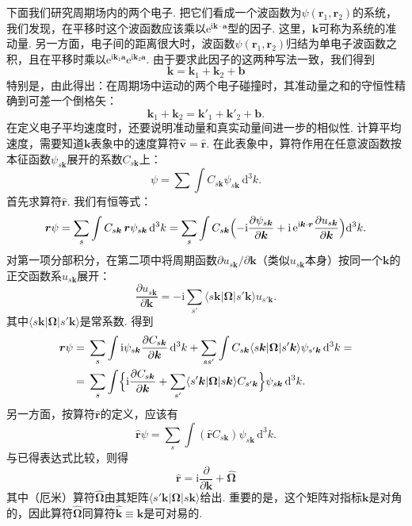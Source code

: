 下面我们研究周期场内的两个电子. 把它们看成一个波函数为$\psi(\bm r_1,\bm r_2)$的系统，我们发现，在平移时这个波函数应该乘以$\mathrm e^{\mathrm i\bm k\cdot\bm a}$型的因子. 这里，$\bm k$可称为系统的准动量. 另一方面，电子间的距离很大时，波函数$\psi(\bm r_1,\bm r_2)$归结为单电子波函数之积，且在平移时乘以$\mathrm e^{\mathrm i\bm k_1\bm a}\mathrm e^{\mathrm i\bm k_2\bm a}$. 由于要求此因子的这两种写法一致，我们得到
\begin{equation}
\bm k=\bm k_1+\bm k_2+\bm b
\label{55.10}
\end{equation}
特别是，由此得出：在周期场中运动的两个电子碰撞时，其准动量之和的守恒性精确到可差一个倒格矢：
\begin{equation}
\bm k_1+\bm k_2=\bm k'_1+\bm k'_2+\bm b.
\label{55.11}
\end{equation}
在定义电子平均速度时，还要说明准动量和真实动量间进一步的相似性. 计算平均速度，需要知道$\bm k$表象中的速度算符$\hat{\bm v}=\hat{\bm r}$. 在此表象中，算符作用在任意波函数按本征函数$\psi_{s\bm k}$展开的系数$C_{s\bm k}$上：
\begin{equation}
\psi=\sum\int C_{s\bm k}\psi_{s\bm k}\,\mathrm d^3k.
\label{55.12}
\end{equation}
首先求算符$\hat{\bm r}$. 我们有恒等式：
\begin{equation*}
\bm r\psi=\sum_s\int C_{s\bm k}\,\bm r\psi_{s\bm k}\,\mathrm d^3k
=\sum_s\int C_{s\bm k}\Bigl(-\mathrm i\frac{\partial\psi_{s\bm k}}{\partial\bm k}
+\mathrm i\,\mathrm e^{\mathrm i\bm k\cdot\bm r}\frac{\partial u_{s\bm k}}{\partial\bm k}\Bigr)\mathrm d^3k.
\end{equation*}
对第一项分部积分，在第二项中将周期函数$\partial u_{s\bm k}/\partial\bm k$（类似$u_{s\bm k}$本身）按同一个$\bm k$的正交函数系$u_{s\bm k}$展开：
\begin{equation}
\frac{\partial u_{s\bm k}}{\partial\bm k}
=-\mathrm i\sum_{s'}\langle s\bm k|\bm\Omega|s'\bm k\rangle u_{s'\bm k}.
\label{55.13}
\end{equation}
其中$\langle s\bm k|\bm\Omega|s'\bm k\rangle$是常系数. 得到
\begin{equation*}
\begin{aligned}
\bm r\psi={}&\sum_s\int\mathrm i\psi_{s\bm k}\frac{\partial C_{s\bm k}}{\partial\bm k}\,\mathrm d^3k
+\sum_{ss'}\int C_{s\bm k}\langle s\bm k|\bm\Omega|s'\bm k\rangle\psi_{s'\bm k}\,\mathrm d^3k=\\
={}&\sum_s\int\Bigl\{\mathrm i\frac{\partial C_{s\bm k}}{\partial\bm k}
+\sum_{s'}\langle s'\bm k|\bm\Omega|s\bm k\rangle C_{s'\bm k}\Bigr\}\psi_{s\bm k}\,\mathrm d^3k.
\end{aligned}
\end{equation*}
另一方面，按算符$\hat{\bm r}$的定义，应该有
\begin{equation*}
\hat{\bm r}\psi=\sum_s\int(\hat{\bm r}C_{s\bm k})\psi_{s\bm k}\,\mathrm d^3k.
\end{equation*}
与已得表达式比较，则得
\begin{equation}
\hat{\bm r}=\mathrm i\frac{\partial}{\partial\bm k}+\hat{\bm\Omega}
\label{55.14}
\end{equation}
其中（厄米）算符$\hat{\bm\Omega}$由其矩阵$\langle s'\bm k|\bm\Omega|s\bm k\rangle$给出. 重要的是，这个矩阵对指标$\bm k$是对角的，因此算符$\hat{\bm\Omega}$同算符$\hat{\bm k}\equiv\bm k$是可对易的.

